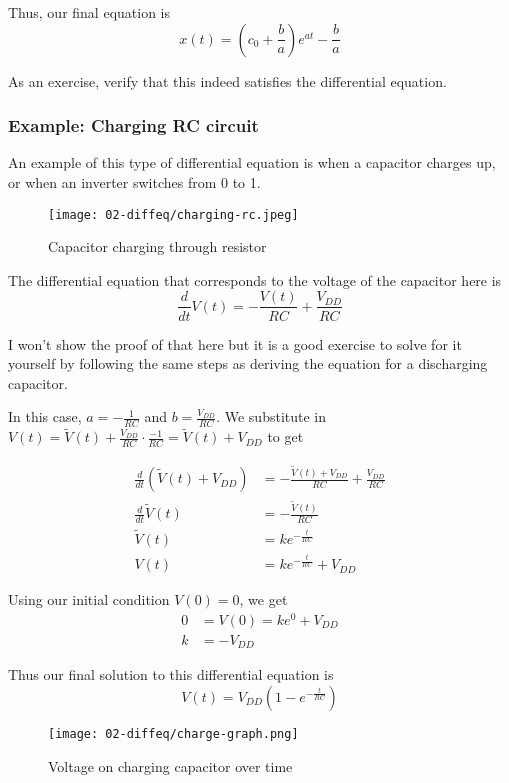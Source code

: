 \documentclass[11pt]{article}
\begin{document}
Thus, our final equation is \[x(t)=(c_0+\frac ba)e^{at}-\frac ba\]

As an exercise, verify that this indeed satisfies the differential equation.

\subsubsection{Example: Charging RC circuit}

An example of this type of differential equation is when a capacitor charges up, or when an inverter switches from 0 to 1.

\begin{figure}[H]
    \centering
        \texttt{[image: 02-diffeq/charging-rc.jpeg]}
    \caption{Capacitor charging through resistor}
\end{figure}

The differential equation that corresponds to the voltage of the capacitor here is \[\frac d{dt}V(t)=-\frac{V(t)}{RC}+\frac{V_{DD}}{RC}\]

I won't show the proof of that here but it is a good exercise to solve for it yourself by following the same steps as deriving the equation for a discharging capacitor.

In this case, $a=-\frac1{RC}$ and $b=\frac{V_{DD}}{RC}$. We substitute in $V(t)=\tilde V(t)+\frac{V_{DD}}{RC}\cdot\frac{-1}{RC}=\tilde V(t)+V_{DD}$ to get 

\begin{align*}
    \frac d{dt}\left(\tilde V(t)+V_{DD}\right)&=-\frac{\tilde V(t)+V_{DD}}{RC}+\frac{V_{DD}}{RC}\\
    \frac d{dt}\tilde V(t)&=-\frac{\tilde V(t)}{RC}\\
    \tilde V(t)&=ke^{-\frac t{RC}}\\
    V(t)&=ke^{-\frac t{RC}}+V_{DD}
\end{align*}

Using our initial condition $V(0)=0$, we get 
\begin{align*}
    0&=V(0)=ke^0+V_{DD}\\
    k&=-V_{DD}
\end{align*}

Thus our final solution to this differential equation is \[V(t)=V_{DD}(1-e^{-\frac t{RC}})\]

\begin{figure}[H]
    \centering
        \texttt{[image: 02-diffeq/charge-graph.png]}
    \caption{Voltage on charging capacitor over time}
\end{figure}
\end{document}

